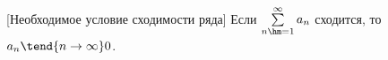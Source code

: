 [Необходимое условие сходимости ряда]
Если $\sum\limits_{n\hm=1}^\infty a_n$ сходится, то $a_n\tend{n\to\infty}0$.
